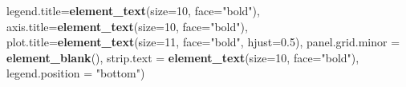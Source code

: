 \documentclass[
]{article}
\newenvironment{Shaded}{\begin{snugshade}}{\end{snugshade}}
\newcommand{\AttributeTok}[1]{\textcolor[rgb]{0.13,0.29,0.53}{#1}}
\newcommand{\DecValTok}[1]{\textcolor[rgb]{0.00,0.00,0.81}{#1}}
\newcommand{\FloatTok}[1]{\textcolor[rgb]{0.00,0.00,0.81}{#1}}
\newcommand{\FunctionTok}[1]{\textcolor[rgb]{0.13,0.29,0.53}{\textbf{#1}}}
\newcommand{\NormalTok}[1]{#1}
\newcommand{\StringTok}[1]{\textcolor[rgb]{0.31,0.60,0.02}{#1}}
\begin{document}
\begin{Shaded}
\begin{Highlighting}[]
        \AttributeTok{legend.title=}\FunctionTok{element\_text}\NormalTok{(}\AttributeTok{size=}\DecValTok{10}\NormalTok{, }\AttributeTok{face=}\StringTok{"bold"}\NormalTok{),}
        \AttributeTok{axis.title=}\FunctionTok{element\_text}\NormalTok{(}\AttributeTok{size=}\DecValTok{10}\NormalTok{, }\AttributeTok{face=}\StringTok{"bold"}\NormalTok{),}
        \AttributeTok{plot.title=}\FunctionTok{element\_text}\NormalTok{(}\AttributeTok{size=}\DecValTok{11}\NormalTok{, }\AttributeTok{face=}\StringTok{"bold"}\NormalTok{, }\AttributeTok{hjust=}\FloatTok{0.5}\NormalTok{),}
        \AttributeTok{panel.grid.minor =} \FunctionTok{element\_blank}\NormalTok{(),}
        \AttributeTok{strip.text =} \FunctionTok{element\_text}\NormalTok{(}\AttributeTok{size=}\DecValTok{10}\NormalTok{, }\AttributeTok{face=}\StringTok{"bold"}\NormalTok{),}
        \AttributeTok{legend.position =} \StringTok{"bottom"}\NormalTok{)}


\end{Highlighting}
\end{Shaded}
\end{document}
